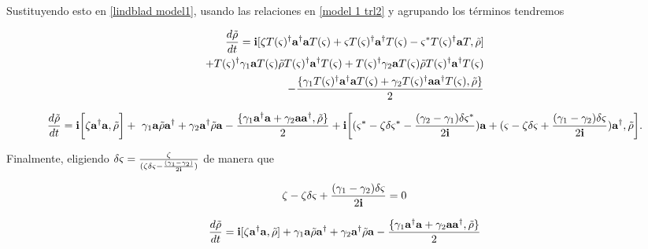 \documentclass{report} %
\numberwithin{equation}{section}
\begin{document}
Sustituyendo esto en \eqref{lindblad model1}, usando las relaciones en \eqref{model 1 trl2} y agrupando los términos tendremos

\begin{Omitir}
\begin{align}
\frac{d \tilde{\rho}}{dt}={\bf i }[\zeta  T(\varsigma)^\dagger {\bf a}^\dagger {\bf a} T(\varsigma) +\varsigma  T(\varsigma)^\dagger{\bf a}^\dagger  T(\varsigma) -\varsigma^*  T(\varsigma)^\dagger {\bf a}T ,\tilde{\rho}] \\
+  T(\varsigma)^\dagger \gamma_1 {\bf a} T(\varsigma) \tilde{\rho}  T(\varsigma)^\dagger {\bf a}^\dagger   T(\varsigma)+
 T(\varsigma)^{\dagger}\gamma_2 {\bf a} T(\varsigma) \tilde{\rho} T(\varsigma)^\dagger {\bf a}^\dagger  T(\varsigma) \\
-\frac{\{\gamma_1  T(\varsigma)^\dagger{\bf a}^\dagger{\bf a}  T(\varsigma)+\gamma_2  T(\varsigma)^\dagger{\bf a}{\bf a}^\dagger  T(\varsigma), \tilde{\rho}\}}{2}
\end{align}
\end{Omitir}

\begin{dmath}
\frac{d \tilde{\rho}}{dt}={\bf i } \bigg[\zeta {\bf a}^\dagger {\bf a},\tilde{\rho}\bigg]+ \
\gamma_1 {\bf a} \tilde{\rho} {\bf a}^\dagger+
\gamma_2 {\bf a}^\dagger\tilde{\rho} {\bf a}
-\frac{\{\gamma_1 {\bf a}^\dagger{\bf a} +\gamma_2 {\bf a}{\bf a}^\dagger, \tilde{\rho}\}}{2} \\
+{\bf i }\bigg[(\varsigma^* - \zeta \delta \varsigma^* -\frac{(\gamma_2-\gamma_1) \delta \varsigma^* 
}{2{\bf i}}) {\bf a} + 
         (\varsigma - \zeta \delta \varsigma +\frac{ (\gamma_1-\gamma_2)\delta \varsigma}{2{\bf i}}){\bf a}^\dagger,\tilde{\rho}\bigg].
\end{dmath}

Finalmente, eligiendo $\delta \varsigma=\frac{\zeta}{(\zeta \delta \varsigma -\frac{ (\gamma_1-\gamma_2)}{2{\bf i}}) }$ de manera que

\begin{equation}
    \zeta - \zeta \delta \varsigma +\frac{ (\gamma_1-\gamma_2)\delta \varsigma}{2{\bf i}}=0
\end{equation}

\begin{align}
\frac{d \tilde{\rho}}{dt}={\bf i }[\zeta {\bf a}^\dagger {\bf a},\tilde{\rho}]+ \gamma_1 {\bf a} \tilde{\rho} {\bf a}^\dagger+
\gamma_2 {\bf a}^\dagger\tilde{\rho} {\bf a}
-\frac{\{\gamma_1 {\bf a}^\dagger{\bf a} +\gamma_2 {\bf a}{\bf a}^\dagger, \tilde{\rho}\}}{2}    
\end{align}
\end{document}
